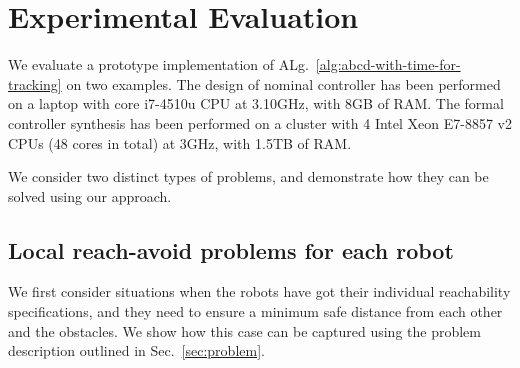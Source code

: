 
\section{Experimental Evaluation}\label{sec:experiments}
We evaluate a prototype implementation of ALg.~\ref{alg:abcd-with-time-for-tracking}
on two examples. 
The design of nominal controller has been performed on a laptop with core i7-4510u CPU at 3.10GHz, with 8GB of
RAM.
The formal controller synthesis has been performed
on a cluster with 4 Intel Xeon E7-8857 v2 CPUs (48 cores in total) at 3GHz, with 1.5TB of
RAM. %

We consider two distinct types of problems, and demonstrate how they can be solved using our approach.

\subsection{Local reach-avoid problems for each robot}
\label{sec:local reach-avoid}

We first consider situations when the robots have got their individual reachability specifications, and they need to ensure a minimum safe distance from each other and the obstacles.
We show how this case can be captured using the problem description outlined in Sec.~\ref{sec:problem}.

